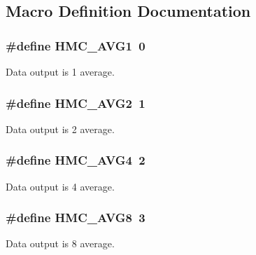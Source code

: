 \subsection{Macro Definition Documentation}
\hypertarget{group___avg_settings_ga0188f97ebf00a8af1cdaa587478d2a90}{
\subsubsection[{H\+M\+C\+\_\+\+A\+V\+G1}]{\setlength{\rightskip}{0pt plus 5cm}\#define H\+M\+C\+\_\+\+A\+V\+G1~0}}\label{group___avg_settings_ga0188f97ebf00a8af1cdaa587478d2a90}
Data output is 1 average. \hypertarget{group___avg_settings_ga2e2164befd111796e1a3bc17823600c5}{
\subsubsection[{H\+M\+C\+\_\+\+A\+V\+G2}]{\setlength{\rightskip}{0pt plus 5cm}\#define H\+M\+C\+\_\+\+A\+V\+G2~1}}\label{group___avg_settings_ga2e2164befd111796e1a3bc17823600c5}
Data output is 2 average. \hypertarget{group___avg_settings_ga07c22d471bceae506c6fbef0d7400dbd}{
\subsubsection[{H\+M\+C\+\_\+\+A\+V\+G4}]{\setlength{\rightskip}{0pt plus 5cm}\#define H\+M\+C\+\_\+\+A\+V\+G4~2}}\label{group___avg_settings_ga07c22d471bceae506c6fbef0d7400dbd}
Data output is 4 average. \hypertarget{group___avg_settings_gaa0195dbd0cfee3a554bb4464046ba781}{
\subsubsection[{H\+M\+C\+\_\+\+A\+V\+G8}]{\setlength{\rightskip}{0pt plus 5cm}\#define H\+M\+C\+\_\+\+A\+V\+G8~3}}\label{group___avg_settings_gaa0195dbd0cfee3a554bb4464046ba781}
Data output is 8 average. 